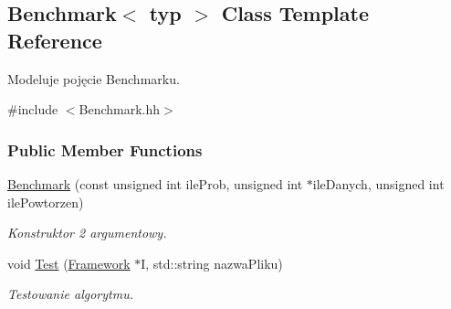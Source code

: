 \hypertarget{class_benchmark}{\subsection{Benchmark$<$ typ $>$ Class Template Reference}
\label{class_benchmark}
}


Modeluje pojęcie Benchmarku.  




{\ttfamily \#include $<$Benchmark.\-hh$>$}

\subsubsection*{Public Member Functions}
\begin{DoxyCompactItemize}
\item 
\hyperlink{class_benchmark_a3649dc431341a349e84485ca11ed22c3}{Benchmark} (const unsigned int ile\-Prob, unsigned int $\ast$ile\-Danych, unsigned int ile\-Powtorzen)
\begin{DoxyCompactList}\small\item\em Konstruktor 2 argumentowy. \end{DoxyCompactList}\item 
void \hyperlink{class_benchmark_a44e1cf8d5a7f74ce37f3714116077068}{Test} (\hyperlink{class_framework}{Framework} $\ast$I, std\-::string nazwa\-Pliku)
\begin{DoxyCompactList}\small\item\em Testowanie algorytmu. \end{DoxyCompactList}\end{DoxyCompactItemize}
